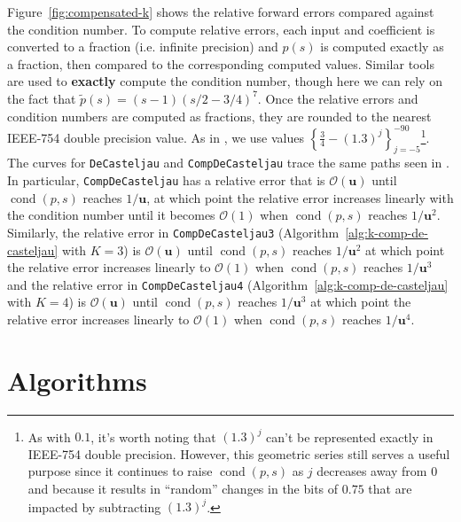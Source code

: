 \documentclass[3p, authoryear, square]{elsarticle}
\theoremstyle{definition}
\newcommand{\cond}[1]{\operatorname{cond}\left(#1\right)}
\newcommand{\bigO}[1]{\mathcal{O}\left(#1\right)}
\newcommand{\mach}{\mathbf{u}}
\begin{document}
Figure~\ref{fig:compensated-k} shows the relative forward errors compared
against the condition number. To compute relative errors, each input and
coefficient is converted to a fraction (i.e. infinite precision) and
\(p(s)\) is computed exactly as a fraction, then
compared to the corresponding computed values. Similar tools are used to
\textbf{exactly} compute the condition number, though here we can rely
on the fact that \(\widetilde{p}(s) = (s - 1)
\left(s/2 - 3/4\right)^7\). Once the relative errors and
condition numbers are computed as fractions, they are rounded to the
nearest IEEE-754 double precision value. As in \cite{Jiang2010}, we use
values \(\left\{\frac{3}{4} - (1.3)^j\right\}_{j=-5}^{-90}\)\footnote{As with
\(0.1\), it's worth noting that \((1.3)^j\) can't be represented exactly in
IEEE-754 double precision. However, this geometric series still serves a
useful purpose since it continues to raise \(\cond{p, s}\) as \(j\) decreases
away from \(0\) and because it results in ``random'' changes in the bits of
\(0.75\) that are impacted by subtracting \((1.3)^j\).}. The curves for
\texttt{DeCasteljau} and \texttt{CompDeCasteljau} trace the same paths seen
in \cite{Jiang2010}. In particular, \texttt{CompDeCasteljau} has a relative
error that is \(\bigO{\mach}\) until \(\cond{p, s}\) reaches
\(1 / \mach\), at which point the relative error increases linearly with
the condition number until it becomes \(\bigO{1}\) when
\(\cond{p, s}\) reaches \(1 / \mach^2\).
Similarly, the relative error in \texttt{CompDeCasteljau3}
(Algorithm~\ref{alg:k-comp-de-casteljau} with \(K = 3\))
is \(\bigO{\mach}\) until \(\cond{p, s}\) reaches
\(1 / \mach^2\) at which point the relative error increases linearly
to \(\bigO{1}\) when \(\cond{p, s}\) reaches \(1 / \mach^3\)
and the relative error in \texttt{CompDeCasteljau4}
(Algorithm~\ref{alg:k-comp-de-casteljau} with \(K = 4\))
is \(\bigO{\mach}\) until \(\cond{p, s}\) reaches
\(1 / \mach^3\) at which point the relative error increases linearly
to \(\bigO{1}\) when \(\cond{p, s}\) reaches \(1 / \mach^4\).

\section*{\refname}


\appendix

\section{Algorithms}\label{sec:appendix-algo}
\end{document}
